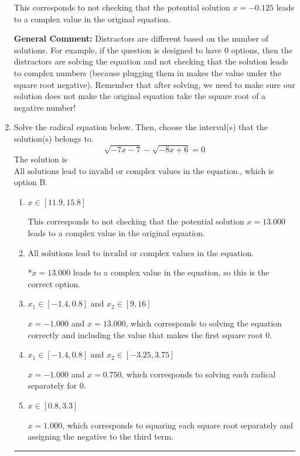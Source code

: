 \documentclass{extbook}[14pt]
\newcommand{\litem}[1]{\item #1

\rule{\textwidth}{0.4pt}}
\begin{document}
\begin{enumerate}
{\begin{enumerate}[label=\Alph*.]
This corresponds to not checking that the potential solution $x = -0.125$ leads to a complex value in the original equation.
\end{enumerate}

\textbf{General Comment:} Distractors are different based on the number of solutions. For example, if the question is designed to have 0 options, then the distractors are solving the equation and not checking that the solution leads to complex numbers (because plugging them in makes the value under the square root negative). Remember that after solving, we need to make sure our solution does not make the original equation take the square root of a negative number!
}
\litem{
Solve the radical equation below. Then, choose the interval(s) that the solution(s) belongs to.
\[ \sqrt{-7 x - 7} - \sqrt{-8 x + 6} = 0 \]The solution is \( \text{All solutions lead to invalid or complex values in the equation.} \), which is option B.\begin{enumerate}[label=\Alph*.]
\item \( x \in [11.9,15.8] \)

This corresponds to not checking that the potential solution $x = 13.000$ leads to a complex value in the original equation.
\item \( \text{All solutions lead to invalid or complex values in the equation.} \)

*$x = 13.000$ leads to a complex value in the equation, so this is the correct option.
\item \( x_1 \in [-1.4, 0.8] \text{ and } x_2 \in [9,16] \)

$x = -1.000$ and $x = 13.000$, which corresponds to solving the equation correctly and including the value that makes the first square root 0.
\item \( x_1 \in [-1.4, 0.8] \text{ and } x_2 \in [-3.25,3.75] \)

$x = -1.000$ and $x = 0.750$, which corresponds to solving each radical separately for 0.
\item \( x \in [0.8,3.3] \)

$x = 1.000$, which corresponds to squaring each square root separately and assigning the negative to the third term.
\end{enumerate}

}
\end{enumerate}
\end{document}
